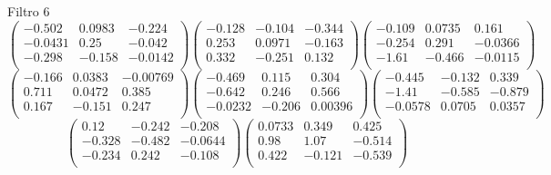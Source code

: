 Filtro 6
{ \small
\[
\begin{pmatrix}
  -0.502 & 0.0983 & -0.224 \\
  -0.0431 & 0.25 & -0.042 \\
  -0.298 & -0.158 & -0.0142 \\
\end{pmatrix}
\begin{pmatrix}
  -0.128 & -0.104 & -0.344 \\
  0.253 & 0.0971 & -0.163 \\
  0.332 & -0.251 & 0.132 \\
\end{pmatrix}
\begin{pmatrix}
  -0.109 & 0.0735 & 0.161 \\
  -0.254 & 0.291 & -0.0366 \\
  -1.61 & -0.466 & -0.0115 \\
\end{pmatrix}
\]
\[
\begin{pmatrix}
  -0.166 & 0.0383 & -0.00769 \\
  0.711 & 0.0472 & 0.385 \\
  0.167 & -0.151 & 0.247 \\
\end{pmatrix}
\begin{pmatrix}
  -0.469 & 0.115 & 0.304 \\
  -0.642 & 0.246 & 0.566 \\
  -0.0232 & -0.206 & 0.00396 \\
\end{pmatrix}
\begin{pmatrix}
  -0.445 & -0.132 & 0.339 \\
  -1.41 & -0.585 & -0.879 \\
  -0.0578 & 0.0705 & 0.0357 \\
\end{pmatrix}
\]
\[
\begin{pmatrix}
  0.12 & -0.242 & -0.208 \\
  -0.328 & -0.482 & -0.0644 \\
  -0.234 & 0.242 & -0.108 \\
\end{pmatrix}
\begin{pmatrix}
  0.0733 & 0.349 & 0.425 \\
  0.98 & 1.07 & -0.514 \\
  0.422 & -0.121 & -0.539 \\
\end{pmatrix}
\]
}

